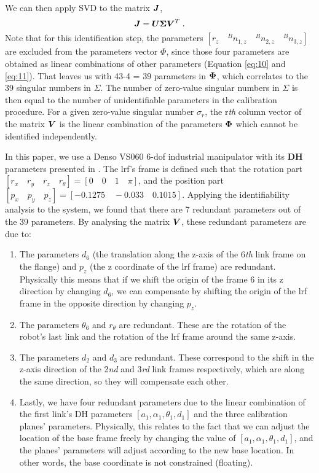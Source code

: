 We can then apply SVD to the matrix $\vb*{J}$,
\begin{equation}
 \vb*{J} = \vb*{U}\vb*{\Sigma}\vb*{V}^T \; .
\end{equation}
Note that for this identification step, the parameters $[r_z \quad {^B}n_{1,z}\quad {^B}n_{2,z}\quad {^B}n_{3,z}]$ are excluded from the parameters vector $\Phi$, since those four parameters are obtained as linear combinations of other parameters (Equation \eqref{eq:10} and \eqref{eq:11}). That leaves us with 43-4 = 39 parameters in $\vb*{\Phi}$, which correlates to the 39 singular numbers in $\Sigma$. The number of zero-value singular numbers in $\Sigma$ is then equal to the number of unidentifiable parameters in the calibration procedure. For a given zero-value singular number $\sigma_r$, the r\textit{th} column vector of the matrix $\vb*{V}$ is the linear combination of the parameters $\vb*{\Phi}$ which cannot be identified independently. 

In this paper, we use a Denso VS060 6-\ac{dof} industrial manipulator with its \textbf{DH} parameters presented in . The \ac{lrf}'s frame is defined such that the rotation part $[r_x \quad r_y \quad r_z \quad r_{\theta}] = [0 \quad 0 \quad 1 \quad \pi]$, and the position part $[p_x \quad p_y\quad p_z] = [-0.1275 \quad -0.033 \quad 0.1015]$. Applying the identifiability analysis to the system, we found that there are 7 redundant parameters out of the 39 parameters. By analysing the matrix $\vb*{V}$, these redundant parameters are due to:
\begin{enumerate}
\item The parameters $d_6$ (the translation along the z-axis of the 6\textit{th} link frame on the flange) and $p_z$ (the z coordinate of the \ac{lrf} frame) are redundant. Physically this means that if we shift the origin of the frame 6 in its z direction by changing $d_6$, we can compensate by shifting the origin of the \ac{lrf} frame in the opposite direction by changing $p_z$.
\item The parameters $\theta_6$ and $r_\theta$ are redundant. These are the rotation of the robot's last link and the rotation of the \ac{lrf} frame around the same z-axis. 
\item The parameters $d_2$ and $d_3$ are redundant. These correspond to the shift in the z-axis direction of the 2\textit{nd} and 3\textit{rd} link frames respectively, which are along the same direction, so they will compensate each other. 
\item Lastly, we have four redundant parameters due to the linear combination of the first link's DH parameters $[a_1, \alpha_1, \theta_1, d_1 ]$ and the three calibration planes' parameters. Physically, this relates to the fact that we can adjust the location of the base frame freely by changing the value of $[a_1, \alpha_1, \theta_1, d_1]$, and the planes' parameters will adjust according to the new base location. In other words, the base coordinate is not constrained (floating). 
\end{enumerate}

